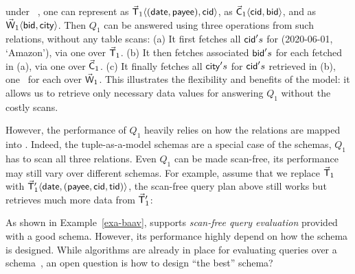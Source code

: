 \begin{example}\label{exa-baav}
under \baav~\cite{VLDB19}, one can represent  as
$\vec{\protect\mathsf{T}}_{1}\langle (\protect\mathsf{date},\allowbreak \protect\mathsf{payee}),\allowbreak \protect\mathsf{cid}\rangle$,
 as $\vec{\protect\mathsf{C}}_{1}\langle \protect\mathsf{cid},\allowbreak \protect\mathsf{bid}\rangle$,
and  as $\vec{\protect\mathsf{W}}_{1}\langle \protect\mathsf{bid},\allowbreak \protect\mathsf{city}\rangle$.
Then $Q_{1}$ can be answered using three \get operations
from such relations, without any table scans:
(a) It first fetches all $\protect\mathsf{cid}'s$ for ({\normalsize 2020-06-01},
{\normalsize `Amazon'}), via one \get over $\vec{\protect\mathsf{T}}_{1}$.
(b) It then fetches associated $\protect\mathsf{bid}'s$ for each
 fetched in (a), via one \get over $\vec{\protect\mathsf{C}}_{1}$.
(c) It finally fetches all $\protect\mathsf{city}'s$ for $\protect\mathsf{cid}'s$
retrieved in (b), one \get~for %
each  over $\vec{\protect\mathsf{W}}_{1}$.
This illustrates the flexibility and benefits of the \baav
model: it allows us to retrieve only necessary data values for
answering $Q_{1}$ without the costly scans. %

\vspace{0.6ex}
However, the performance of $Q_{1}$ heavily relies on %
how
the relations are mapped into \baav. %
Indeed, the
tuple-as-a-model schemas are a special case of the \baav
schemas,  $Q_{1}$
has to %
scan all three relations. Even $Q_{1}$
can be made scan-free, its performance may still vary over
different \baav schemas. For example, assume that
we replace $\vec{\protect\mathsf{T}}_{1}$
with $\vec{\protect\mathsf{T}}_{1}'\langle \protect\mathsf{date},\allowbreak (\protect\mathsf{payee},\allowbreak
  \protect\mathsf{cid},\allowbreak \protect\mathsf{tid})\rangle$, the %
scan-free query %
plan above
still works but retrieves much %
more data %
from $\vec{\protect\mathsf{T}}_{1}'$:
\end{example}


As shown in Example~\ref{exa-baav}, \baav supports {\em scan-free
query evaluation} provided with a good \baav schema.  However,
its performance highly depend on how the schema is designed.
While algorithms are already in place for %
evaluating %
queries over a \baav schema~\cite{VLDB19}, an open question is
how to design ``the best'' \baav schema?

